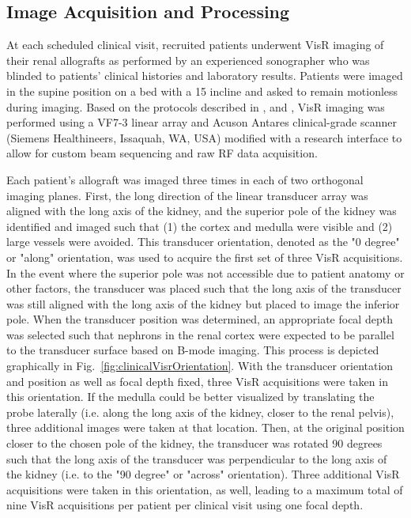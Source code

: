 \subsection{Image Acquisition and Processing}
\label{sec:transplantImageAcq}

At each scheduled clinical visit, recruited patients underwent VisR imaging of their renal allografts as performed by an experienced sonographer who was blinded to patients' clinical histories and laboratory results. Patients were imaged in the supine position on a bed with a 15\textdegree{} incline and asked to remain motionless during imaging. Based on the protocols described in \cite{hossain_Acoustic_2017,hossain_Evaluating_2018}, and \cite{hossain_Variability_2019}, VisR imaging was performed using a VF7-3 linear array and Acuson Antares clinical-grade scanner (Siemens Healthineers, Issaquah, WA, USA) modified with a research interface to allow for custom beam sequencing and raw RF data acquisition.

Each patient's allograft was imaged three times in each of two orthogonal imaging planes. First, the long direction of the linear transducer array was aligned with the long axis of the kidney, and the superior pole of the kidney was identified and imaged such that (1) the cortex and medulla were visible and (2) large vessels were avoided. This transducer orientation, denoted as the "0 degree" or "along" orientation, was used to acquire the first set of three VisR acquisitions. In the event where the superior pole was not accessible due to patient anatomy or other factors, the transducer was placed such that the long axis of the transducer was still aligned with the long axis of the kidney but placed to image the inferior pole. When the transducer position was determined, an appropriate focal depth was selected such that nephrons in the renal cortex were expected to be parallel to the transducer surface based on B-mode imaging. This process is depicted graphically in Fig.~\ref{fig:clinicalVisrOrientation}. With the transducer orientation and position as well as focal depth fixed, three VisR acquisitions were taken in this orientation. If the medulla could be better visualized by translating the probe laterally (i.e. along the long axis of the kidney, closer to the renal pelvis), three additional images were taken at that location. Then, at the original position closer to the chosen pole of the kidney, the transducer was rotated 90 degrees such that the long axis of the transducer was perpendicular to the long axis of the kidney (i.e. to the "90 degree" or "across" orientation). Three additional VisR acquisitions were taken in this orientation, as well, leading to a maximum total of nine VisR acquisitions per patient per clinical visit using one focal depth.

